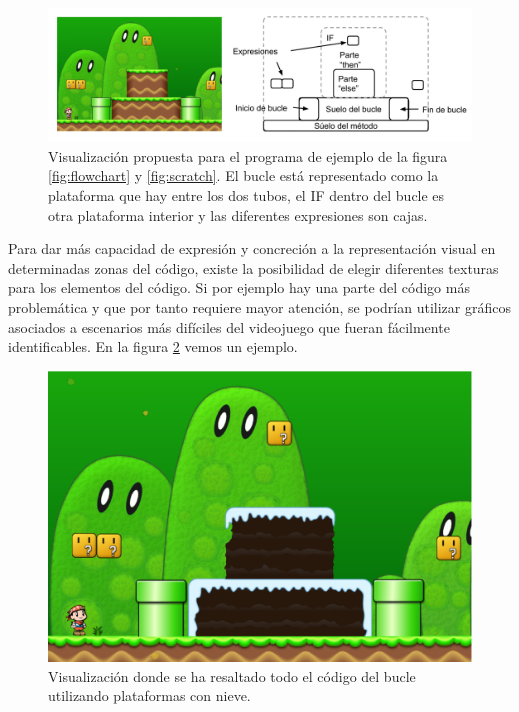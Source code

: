 \documentclass{llncs}
\begin{document}
\begin{figure}[ht]
\begin{center}
\includegraphics[scale=0.4]{images/flowchartgame2.pdf}
\caption{Visualización propuesta para el programa de ejemplo de la figura \ref{fig:flowchart} y \ref{fig:scratch}. El bucle está representado como la plataforma que hay entre los dos tubos, el IF dentro del bucle es otra plataforma interior y las diferentes expresiones son cajas.
\label{fig:flowchartgame}}
\end{center}
\end{figure}

Para dar más capacidad de expresión y concreción a la representación visual en determinadas zonas del código, existe la posibilidad de elegir diferentes texturas para los elementos del código. Si por ejemplo hay una parte del código más problemática y que por tanto requiere mayor atención, se podrían utilizar gráficos asociados a escenarios más difíciles del videojuego que fueran fácilmente identificables. En la figura \ref{fig:texture} vemos un ejemplo.

\begin{figure}[ht]
\begin{center}
\includegraphics[scale=0.15]{images/texture.eps}
\caption{Visualización donde se ha resaltado todo el código del bucle utilizando plataformas con nieve.
\label{fig:texture}}
\end{center}
\end{figure}
\end{document}
